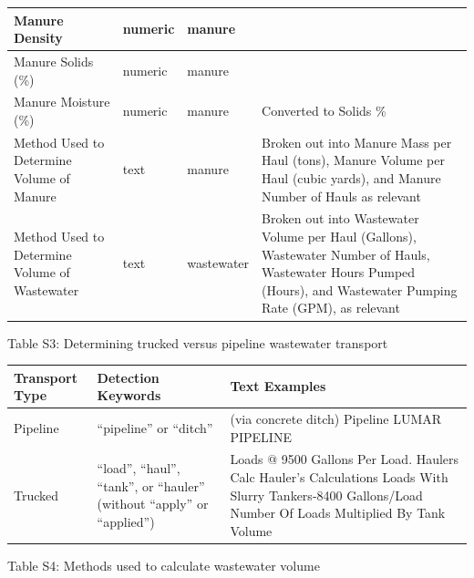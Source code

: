\documentclass{iopjournal}
\begin{document}
\begin{longtable}{| >{\raggedright\arraybackslash}p{4.5cm} | l | >{\raggedright\arraybackslash}p{2cm} | >{\raggedright\arraybackslash}p{4.5cm} |}
\hline
Manure Density & numeric & manure &  \\
\hline
Manure Solids (\%) & numeric & manure &  \\
\hline
Manure Moisture (\%) & numeric & manure & Converted to Solids \% \\
\hline
Method Used to Determine Volume of Manure & text & manure & Broken out into Manure Mass per Haul (tons), Manure Volume per Haul (cubic yards), and Manure Number of Hauls as relevant \\
\hline
Method Used to Determine Volume of Wastewater & text & wastewater & Broken out into Wastewater Volume per Haul (Gallons), Wastewater Number of Hauls, Wastewater Hours Pumped (Hours), and Wastewater Pumping Rate (GPM), as relevant \\
\hline

\end{longtable}

Table S3: Determining trucked versus pipeline wastewater transport

\begin{longtable}{| >{\raggedright\arraybackslash}p{3.5cm} | >{\raggedright\arraybackslash}p{2.8cm} | >{\raggedright\arraybackslash}p{6.5cm} |}
\hline
\textbf{Transport Type} & \textbf{Detection Keywords} & \textbf{Text Examples} \\
\hline
Pipeline & ``pipeline'' or ``ditch'' &

(via concrete ditch) \newline
Pipeline \newline
LUMAR PIPELINE \\ \hline Trucked & ``load'', ``haul'', ``tank'', or ``hauler'' (without ``apply'' or ``applied'') &
247 Loads @ 9500 Gallons Per Load. \newline
Haulers Calc \newline
Hauler's Calculations \newline
100 Loads With Slurry Tankers-8400 Gallons/Load \newline
Number Of Loads Multiplied By Tank Volume \\ \hline \end{longtable}



Table S4: Methods used to calculate wastewater volume
\end{document}
